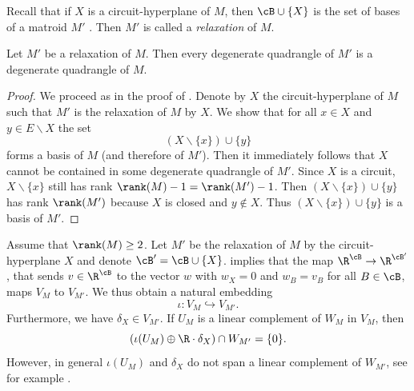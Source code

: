Recall that if $X$ is a circuit-hyperplane of $M$, then $\cB\cup\{X\}$ is the set of bases of a matroid $M'$ \cite[Theorem~1.5.14]{oxley}. Then $M'$ is called a \emph{relaxation} of $M$.

\begin{lem}\label{lem:relax}
    Let $M'$ be a relaxation of $M$. Then every degenerate quadrangle of $M'$ is a degenerate quadrangle of $M$.
\end{lem}

\begin{proof}
    We proceed as in the proof of \cite[Lemma~3.43]{masterleon}.
    Denote by $X$ the circuit-hyperplane of $M$ such that $M'$ is the relaxation of $M$ by $X$.
    We show that for all $x\in X$ and $y\in E\smallsetminus X$ the set
    \[(X\smallsetminus\{x\})\cup\{y\}\]
    forms a basis of $M$ (and therefore of $M'$). Then it immediately follows that $X$ cannot be contained in some degenerate quadrangle of $M'$.
    Since $X$ is a circuit, $X\smallsetminus\{x\}$ still has rank $\rank(M)-1=\rank(M')-1$. Then $(X\smallsetminus\{x\})\cup\{y\}$ has rank $\rank(M')$ because $X$ is closed and $y\notin X$. Thus $(X\smallsetminus\{x\})\cup\{y\}$ is a basis of $M'$.
\end{proof}

\begin{rem}\label{rem:embed}
    Assume that $\rank(M)\geq2$.
    Let $M'$ be the relaxation of $M$ by the circuit-hyperplane $X$ and denote $\cB'=\cB\cup\{X\}$.  implies that the map $\R^{\cB}\to\R^{\cB'}$, that sends $v\in\R^{\cB}$ to the vector $w$ with $w_{X}=0$ and $w_B=v_B$ for all $B\in\cB$, maps $V_M$ to $V_{M'}$. We thus obtain a natural embedding
    \begin{equation*}
        \iota\colon V_M\hookrightarrow V_{M'}.
    \end{equation*}
    Furthermore, we have $\delta_X\in V_{M'}$. If $U_M$ is a linear complement of $W_M$ in $V_M$, then
    \begin{equation*}
        \left(\iota(U_M)\oplus\R\cdot\delta_X\right)\cap W_{M'}=\{0\}.
    \end{equation*}
    However, in general $\iota(U_M)$ and $\delta_X$ do not span a linear complement of $W_{M'}$, see for example \cite[Table~1]{BrandenDLeon}.
\end{rem}

